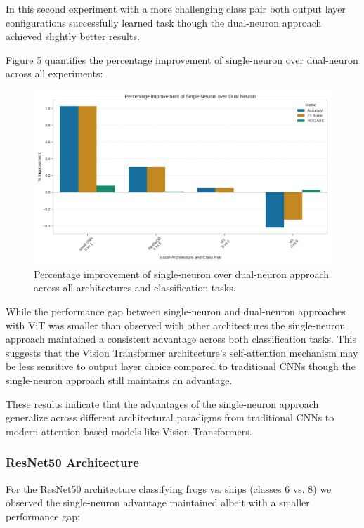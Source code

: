 \documentclass[11pt]{article}
\begin{document}
In this second experiment with a more challenging class pair both output layer configurations successfully learned task though the dual-neuron approach achieved slightly better results.

Figure 5 quantifies the percentage improvement of single-neuron over dual-neuron across all experiments:

\begin{figure}[htbp]
\centering
\includegraphics[width=\textwidth]{figures/improvement_percentage.png}
\caption{Percentage improvement of single-neuron over dual-neuron approach across all architectures and classification tasks.}
\end{figure}

While the performance gap between single-neuron and dual-neuron approaches with ViT was smaller than observed with other architectures the single-neuron approach maintained a consistent advantage across both classification tasks. This suggests that the Vision Transformer architecture's self-attention mechanism may be less sensitive to output layer choice compared to traditional CNNs though the single-neuron approach still maintains an advantage.

These results indicate that the advantages of the single-neuron approach generalize across different architectural paradigms from traditional CNNs to modern attention-based models like Vision Transformers.

\subsubsection{ResNet50 Architecture}
For the ResNet50 architecture classifying frogs vs. ships (classes 6 vs. 8) we observed the single-neuron advantage maintained albeit with a smaller performance gap:
\end{document}
